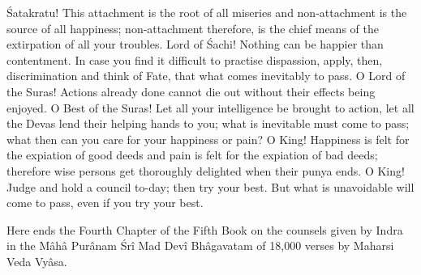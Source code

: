 \'Satakratu! This attachment is the root of all miseries and non-attachment is the source of all happiness; non-attachment therefore, is the chief means of the extirpation of all your troubles. Lord of \'Sachi! Nothing can be happier than contentment. In case you find it difficult to practise dispassion, apply, then, discrimination and think of Fate, that what comes inevitably to pass. O Lord of the Suras! Actions already done cannot die out without their effects being enjoyed. O Best of the Suras! Let all your intelligence be brought to action, let all the Devas lend their helping hands to you; what is inevitable must come to pass; what then can you care for your happiness or pain? O King! Happiness is felt for the expiation of good deeds and pain is felt for the expiation of bad deeds; therefore wise persons get thoroughly delighted when their punya ends. O King! Judge and hold a council to-day; then try your best. But what is unavoidable will come to pass, even if you try your best.

Here ends the Fourth Chapter of the Fifth Book on the counsels given by Indra in the M\^ah\^a Pur\^anam \'Sr\^i Mad Dev\^i Bh\^agavatam of 18,000 verses by Maharsi Veda Vy\^asa.